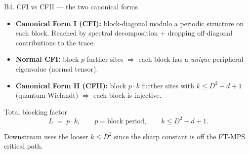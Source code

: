 \documentclass[aspectratio=169,10pt]{beamer}
\begin{document}
\begin{frame}{B4. CFI vs CFII --- the two canonical forms}
    \begin{itemize}
        \item \textbf{Canonical Form I (CFI):} block-diagonal modulo a periodic structure on each block. Reached by spectral decomposition + dropping off-diagonal contributions to the trace.
        \item \textbf{Normal CFI:} block $p$ further sites $\Rightarrow$ each block has a \emph{unique} peripheral eigenvalue (normal tensor).
        \item \textbf{Canonical Form II (CFII):} block $p\!\cdot\!k$ further sites with $k \leq D^2 - d + 1$ (quantum Wielandt) $\Rightarrow$ each block is injective.
    \end{itemize}
    \vspace{0.6em}
    \begin{block}{Total blocking factor}
        \[
            L \;=\; p \cdot k, \qquad p = \text{block period}, \qquad k \leq D^2 - d + 1.
        \]
    \end{block}
    \textcolor{dimwhite}{\footnotesize Downstream uses the looser $k \leq D^2$ since the sharp constant is off the FT-MPS critical path.}
\end{frame}
\end{document}
